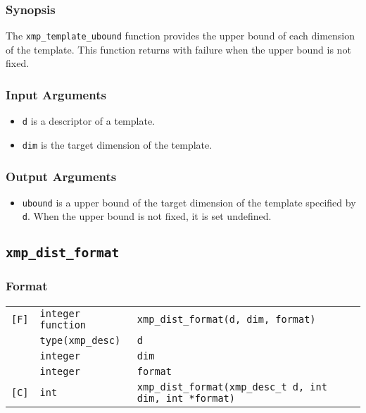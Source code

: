 \subsubsection*{Synopsis}

The {\tt xmp\_template\_ubound} function provides the upper bound of each
dimension of the template. This function returns with failure when the
upper bound is not fixed.

\subsubsection*{Input Arguments}
\begin{itemize}
 \item {\tt d} is a descriptor of a template.
 \item {\tt dim} is the target dimension of the template.
\end{itemize}

\subsubsection*{Output Arguments}
\begin{itemize}
 \item {\tt ubound} is a upper bound of the target dimension of the
       template specified by {\tt d}. When the upper bound is not fixed,
       it is set undefined.
\end{itemize}


\subsection{\tt xmp\_dist\_format}

\subsubsection*{Format}

\begin{tabular}{lll}

\verb![F]!& {\tt integer function}& {\tt xmp\_dist\_format(d, dim, format)}\\
          & {\tt type(xmp\_desc)} & {\tt d}\\
          & {\tt integer} & {\tt dim}\\
          & {\tt integer} & {\tt format}\\

\verb![C]!&  {\tt int}& {\tt xmp\_dist\_format(xmp\_desc\_t d, int dim, int *format)}\\

\end{tabular}

